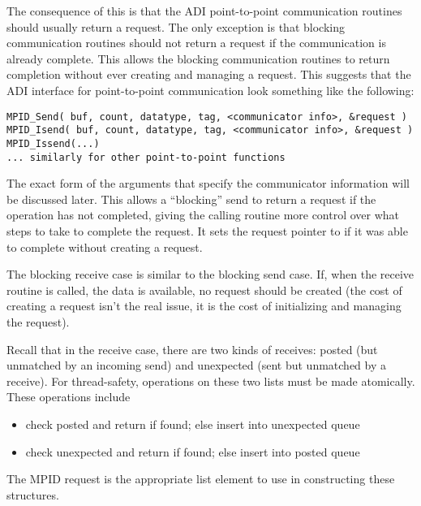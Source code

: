 The
consequence of this is that the ADI point-to-point communication routines
should usually return a request.  The only exception is that blocking
communication routines should not return a request if the
communication is already complete.  This allows
the blocking communication routines to
return completion without ever creating and managing a request.
This suggests that the ADI interface for point-to-point communication
look something like the following: 

\begin{small}
\begin{verbatim}
MPID_Send( buf, count, datatype, tag, <communicator info>, &request )
MPID_Isend( buf, count, datatype, tag, <communicator info>, &request )
MPID_Issend(...)
... similarly for other point-to-point functions
\end{verbatim}
\end{small}

\noindent
The exact form of the arguments that specify the communicator
information will be discussed later.
This allows a ``blocking'' send to return a request if the operation
has not completed, giving the calling routine more control over
what steps to take to complete the request.  It sets the request
pointer to  if it was able to complete without creating a request.


The blocking receive case is similar to the blocking send case.  If,
when the receive routine is called, the data is available, no request
should be created (the cost of creating a request isn't the real
issue, it is the cost of initializing and managing the request).  

Recall
that in the receive case, there are two kinds of receives: posted (but
unmatched by an incoming send) and unexpected (sent but unmatched by a
receive).  For thread-safety, operations on these
two lists must be 
made atomically.  These operations include 
\begin{itemize}
\item check posted and return if found; else insert into unexpected queue
\item check unexpected and return if found; else insert into posted queue
\end{itemize}
The MPID request is the appropriate list element to use in
constructing these structures.

